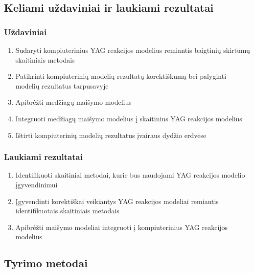 \documentclass[]{VUMIFTemplateClass}
\begin{document}
\subsection{Keliami uždaviniai ir laukiami rezultatai}
\subsubsection{Uždaviniai}
\begin{enumerate}
  
    \item Sudaryti kompiuterinius YAG reakcijos modelius remiantis baigtinių skirtumų skaitiniais metodais
    \item Patikrinti kompiuterinių modelių rezultatų korektiškumą bei palyginti modelių rezultatus tarpusavyje
    \item Apibrėžti medžiagų maišymo modelius
    \item Integruoti medžiagų maišymo modelius į skaitinius YAG reakcijos modelius
    \item Ištirti kompiuterinių modelių rezultatus įvairaus dydžio erdvėse
\end{enumerate}
\subsubsection{Laukiami rezultatai}
\begin{enumerate}
    \item Identifikuoti skaitiniai metodai, kurie bus naudojami YAG reakcijos modelio įgyvendinimui

    \item Įgyvendinti korektiškai veikiantys YAG reakcijos modeliai remiantis identifikuotais skaitiniais metodais

    \item Apibrėžti maišymo modeliai integruoti į kompiuterinius YAG reakcijos modelius

\end{enumerate}

\newpage

\subsection{Tyrimo metodai}
\end{document}
